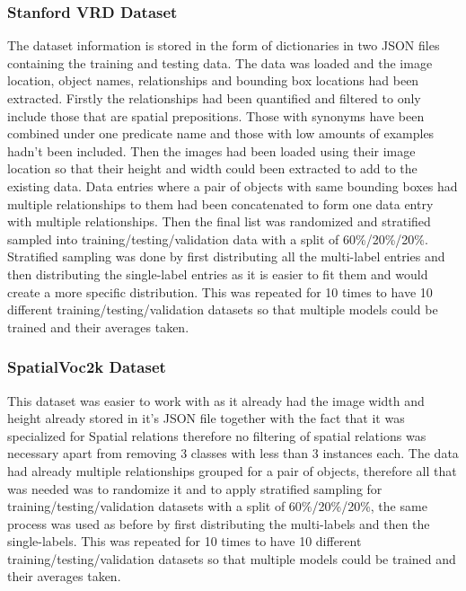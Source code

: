 \documentclass{csfyp}
\begin{document}
\subsubsection{Stanford VRD Dataset}
The dataset information is stored in the form of dictionaries in two JSON files containing the training and testing data. The data was loaded and the image location, object names, relationships and bounding box locations had been extracted. Firstly the relationships had been quantified and filtered to only include those that are spatial prepositions. Those with synonyms have been combined under one \Gls{predicate} name and those with low amounts of examples hadn’t been included. Then the images had been loaded using their image location so that their height and width could been extracted to add to the existing data. Data entries where a pair of objects with same bounding boxes had multiple relationships to them had been concatenated to form one data entry with multiple relationships. Then the final list was randomized and stratified sampled into training/testing/validation data with a split of 60\%/20\%/20\%. Stratified sampling was done by first distributing all the multi-label entries and then distributing the single-label entries as it is easier to fit them and would create a more specific distribution. This was repeated for 10 times to have 10 different training/testing/validation datasets so that multiple models could be trained and their averages taken.

\subsubsection{SpatialVoc2k Dataset}
This dataset was easier to work with as it already had the image width and height already stored in it’s JSON file together with the fact that it was specialized for Spatial relations therefore no filtering of spatial relations was necessary apart from removing 3 classes with less than 3 instances each. The data had already multiple relationships grouped for a pair of objects, therefore all that was needed was to randomize it and to apply stratified sampling for training/testing/validation datasets with a split of 60\%/20\%/20\%, the same process was used as before by first distributing the multi-labels and then the single-labels. This was repeated for 10 times to have 10 different training/testing/validation datasets so that multiple models could be trained and their averages taken.
\end{document}
